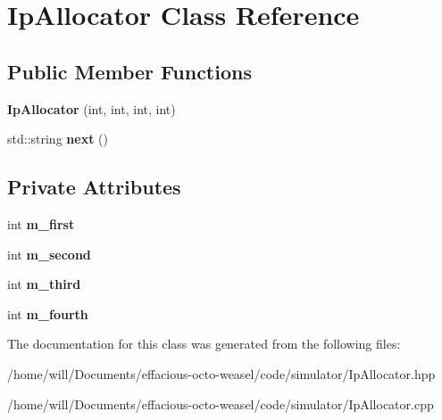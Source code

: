 \hypertarget{class_ip_allocator}{}\section{Ip\+Allocator Class Reference}
\label{class_ip_allocator}
\subsection*{Public Member Functions}
\begin{DoxyCompactItemize}
\item 
{\bfseries Ip\+Allocator} (int, int, int, int)\hypertarget{class_ip_allocator_a2bee8f195b2a86076b18d7facde8d600}{}\label{class_ip_allocator_a2bee8f195b2a86076b18d7facde8d600}

\item 
std\+::string {\bfseries next} ()\hypertarget{class_ip_allocator_a6ea03f472fbb5c96f887d133cb748705}{}\label{class_ip_allocator_a6ea03f472fbb5c96f887d133cb748705}

\end{DoxyCompactItemize}
\subsection*{Private Attributes}
\begin{DoxyCompactItemize}
\item 
int {\bfseries m\+\_\+first}\hypertarget{class_ip_allocator_af60477226c04faf017beeaea8533b532}{}\label{class_ip_allocator_af60477226c04faf017beeaea8533b532}

\item 
int {\bfseries m\+\_\+second}\hypertarget{class_ip_allocator_a428d1005593568efb30697ffd74f93d9}{}\label{class_ip_allocator_a428d1005593568efb30697ffd74f93d9}

\item 
int {\bfseries m\+\_\+third}\hypertarget{class_ip_allocator_aeed66ca1899c515276096d8bc3c4916c}{}\label{class_ip_allocator_aeed66ca1899c515276096d8bc3c4916c}

\item 
int {\bfseries m\+\_\+fourth}\hypertarget{class_ip_allocator_ac34dc00c9ac1b1a226714f94949da7ce}{}\label{class_ip_allocator_ac34dc00c9ac1b1a226714f94949da7ce}

\end{DoxyCompactItemize}


The documentation for this class was generated from the following files\+:\begin{DoxyCompactItemize}
\item 
/home/will/\+Documents/effacious-\/octo-\/weasel/code/simulator/Ip\+Allocator.\+hpp\item 
/home/will/\+Documents/effacious-\/octo-\/weasel/code/simulator/Ip\+Allocator.\+cpp\end{DoxyCompactItemize}
